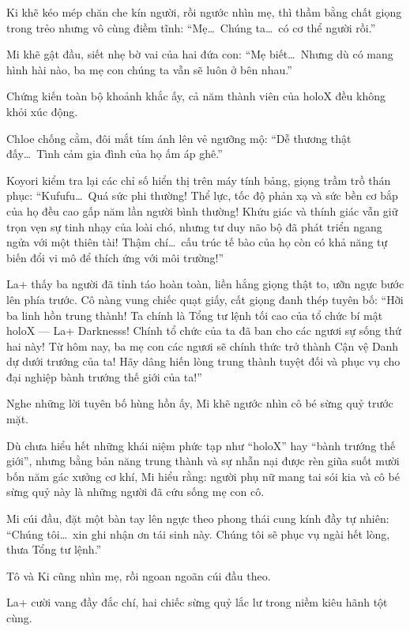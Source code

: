 \documentclass[../main.tex]{subfiles}
\begin{document}
Ki khẽ kéo mép chăn che kín người, rồi ngước nhìn mẹ, thì thầm bằng chất giọng trong trẻo nhưng vô cùng điềm tĩnh: ``Mẹ\dots\ Chúng ta\dots\ có cơ thể người rồi.''

Mi khẽ gật đầu, siết nhẹ bờ vai của hai đứa con: ``Mẹ biết\dots\ Nhưng dù có mang hình hài nào, ba mẹ con chúng ta vẫn sẽ luôn ở bên nhau.''

Chứng kiến toàn bộ khoảnh khắc ấy, cả năm thành viên của holoX đều không khỏi xúc động.

Chloe chống cằm, đôi mắt tím ánh lên vẻ ngưỡng mộ: ``Dễ thương thật đấy\dots\ Tình cảm gia đình của họ ấm áp ghê.''

Koyori kiểm tra lại các chỉ số hiển thị trên máy tính bảng, giọng trầm trồ thán phục: ``Kufufu\dots\ Quá sức phi thường! Thể lực, tốc độ phản xạ và sức bền cơ bắp của họ đều cao gấp năm lần người bình thường! Khứu giác và thính giác vẫn giữ trọn vẹn sự tinh nhạy của loài chó, nhưng tư duy não bộ đã phát triển ngang ngửa với một thiên tài! Thậm chí\dots\ cấu trúc tế bào của họ còn có khả năng tự biến đổi vi mô để thích ứng với môi trường!''

La+ thấy ba người đã tỉnh táo hoàn toàn, liền hắng giọng thật to, ưỡn ngực bước lên phía trước. Cô nàng vung chiếc quạt giấy, cất giọng đanh thép tuyên bố: ``Hỡi ba linh hồn trung thành! Ta chính là Tổng tư lệnh tối cao của tổ chức bí mật holoX — La+ Darknesss! Chính tổ chức của ta đã ban cho các ngươi sự sống thứ hai này! Từ hôm nay, ba mẹ con các ngươi sẽ chính thức trở thành Cận vệ Danh dự dưới trướng của ta! Hãy dâng hiến lòng trung thành tuyệt đối và phục vụ cho đại nghiệp bành trướng thế giới của ta!''

Nghe những lời tuyên bố hùng hồn ấy, Mi khẽ ngước nhìn cô bé sừng quỷ trước mặt.

Dù chưa hiểu hết những khái niệm phức tạp như ``holoX'' hay ``bành trướng thế giới'', nhưng bằng bản năng trung thành và sự nhẫn nại được rèn giũa suốt mười bốn năm gác xưởng cơ khí, Mi hiểu rằng: người phụ nữ mang tai sói kia và cô bé sừng quỷ này là những người đã cứu sống mẹ con cô.

Mi cúi đầu, đặt một bàn tay lên ngực theo phong thái cung kính đầy tự nhiên: ``Chúng tôi\dots\ xin ghi nhận ơn tái sinh này. Chúng tôi sẽ phục vụ ngài hết lòng, thưa Tổng tư lệnh.''

Tô và Ki cũng nhìn mẹ, rồi ngoan ngoãn cúi đầu theo.

La+ cười vang đầy đắc chí, hai chiếc sừng quỷ lắc lư trong niềm kiêu hãnh tột cùng.
\end{document}

